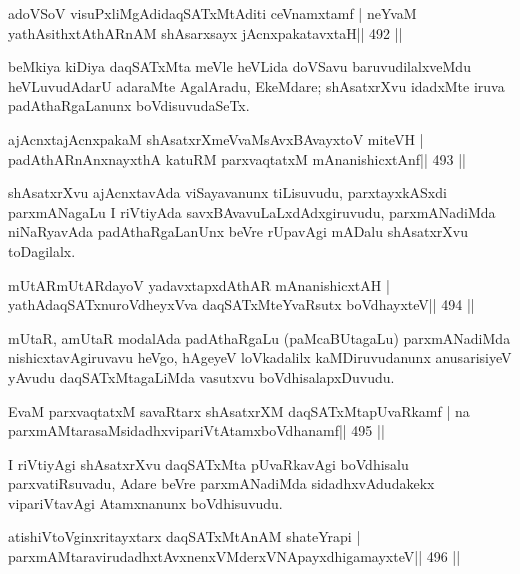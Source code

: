 \begin{shl}
adoVSoV visuPxliMgAdidaqSATxMtAditi ceVnamxtamf |
neYvaM yathAsithxtAthARnAM shAsarxsayx jAcnxpakatavxtaH\hfill || 492 ||
\end{shl}

\begin{artha}
beMkiya kiDiya daqSATxMta meVle heVLida doVSavu baruvudilalxveMdu heVLuvudAdarU adaraMte AgalAradu, EkeMdare; shAsatxrXvu idadxMte iruva padAthaRgaLanunx boVdisuvudaSeTx.
\end{artha}



\begin{shl}
ajAcnxtajAcnxpakaM shAsatxrXmeVvaMsAvxBAvayxtoV miteVH |
padAthARnAnxnayxthA katuRM parxvaqtatxM mAnanishicxtAnf\hfill || 493 ||
\end{shl}

\begin{artha}
shAsatxrXvu ajAcnxtavAda viSayavanunx tiLisuvudu, parxtayxkASxdi parxmANagaLu I riVtiyAda savxBAvavuLaLxdAdxgiruvudu, parxmANadiMda niNaRyavAda padAthaRgaLanUnx beVre rUpavAgi mADalu shAsatxrXvu toDagilalx.
\end{artha}

\begin{shl}
mUtARmUtARdayoV yadavxtapxdAthAR mAnanishicxtAH |
yathAdaqSATxnuroVdheyxVva daqSATxMteYvaRsutx boVdhayxteV\hfill || 494 ||
\end{shl}

\begin{artha}
mUtaR, amUtaR modalAda padAthaRgaLu (paMcaBUtagaLu) parxmANadiMda nishicxtavAgiruvavu heVgo, hAgeyeV loVkadalilx kaMDiruvudanunx anusarisiyeV yAvudu daqSATxMtagaLiMda vasutxvu boVdhisalapxDuvudu.
\end{artha}

\begin{shl}
EvaM parxvaqtatxM savaRtarx shAsatxrXM daqSATxMtapUvaRkamf |
na parxmAMtarasaMsidadhxvipariVtAtamxboVdhanamf\hfill || 495 ||
\end{shl}

\begin{artha}
I riVtiyAgi shAsatxrXvu daqSATxMta pUvaRkavAgi boVdhisalu
parxvatiRsuvadu, Adare beVre parxmANadiMda sidadhxvAdudakekx
vipariVtavAgi Atamxnanunx boVdhisuvudu.
\end{artha}

\begin{shl}
atishiVtoV\s ginxritayxtarx daqSATxMtAnAM shateYrapi |
parxmAMtaravirudadhxtAvxnenxVMderxVNApayxdhigamayxteV\hfill || 496 ||
\end{shl}

